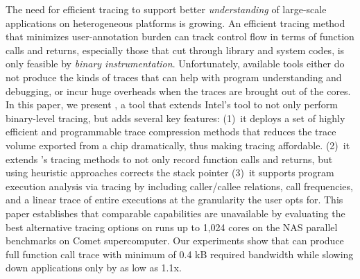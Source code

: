 The need for efficient tracing to 
support better \textit{understanding} of
large-scale applications on heterogeneous platforms is growing. 
%
An efficient tracing method that minimizes user-annotation burden
can track control flow in terms of function calls and returns, especially
those that cut through library and system codes, 
is only feasible by \textit{binary instrumentation}.
%
Unfortunately, available tools either do not produce the kinds
of traces that can help with program understanding and debugging,
or incur huge overheads when
the traces are brought out of the cores.
%
In this paper, we present \parlot,  a tool that extends Intel's \pin
tool to not only perform binary-level tracing, but adds several key
features: (1)~it deploys a set of highly efficient and programmable
trace compression methods that reduces the trace volume exported 
from a chip dramatically, thus making tracing affordable.
(2)~it extends \pin's tracing methods to not only record function
calls and returns, but using heuristic approaches corrects the
stack pointer
(3)~it supports program execution analysis via tracing by
including caller/callee
relations, call frequencies, and a linear trace of entire executions
at the granularity the user opts for.
%
This paper establishes that comparable capabilities are 
unavailable by evaluating the best alternative tracing options
on runs up to 1,024 cores on the NAS parallel benchmarks on 
Comet supercomputer.
%
Our experiments show that \parlot can produce full function 
call trace with minimum of 0.4 kB required bandwidth while 
slowing down applications only by as low as 1.1x. 
%
